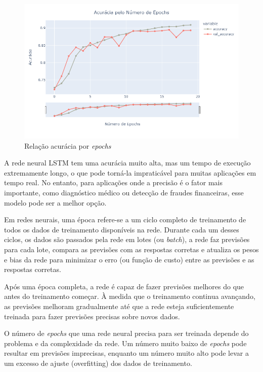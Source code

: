 \begin{figure}[H]
    \centering
    \includegraphics[scale=0.55]{./figs/lstm_acuracy.png}
    \caption{Relação acurácia por \textit{epochs}}
    \label{fig:lstmacuracy}
\end{figure}

A rede neural LSTM tem uma acurácia muito alta, mas um tempo de execução extremamente longo, o que pode torná-la impraticável para muitas aplicações em tempo real. No entanto, para aplicações onde a precisão é o fator mais importante, como diagnóstico médico ou detecção de fraudes financeiras, esse modelo pode ser a melhor opção.

Em redes neurais, uma época refere-se a um ciclo completo de treinamento de todos os dados de treinamento disponíveis na rede. Durante cada um desses ciclos, os dados são passados pela rede em lotes (ou \textit{batch}), a rede faz previsões para cada lote, compara as previsões com as respostas corretas e atualiza os pesos e bias da rede para minimizar o erro (ou função de custo) entre as previsões e as respostas corretas.

Após uma época completa, a rede é capaz de fazer previsões melhores do que antes do treinamento começar. À medida que o treinamento continua avançando, as previsões melhoram gradualmente até que a rede esteja suficientemente treinada para fazer previsões precisas sobre novos dados.

O número de \textit{epochs} que uma rede neural precisa para ser treinada depende do problema e da complexidade da rede. Um número muito baixo de \textit{epochs} pode resultar em previsões imprecisas, enquanto um número muito alto pode levar a um excesso de ajuste (overfitting) dos dados de treinamento.

